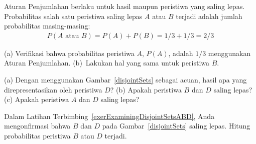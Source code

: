 Aturan Penjumlahan berlaku untuk hasil maupun peristiwa yang saling lepas. Probabilitas salah satu peristiwa saling lepas $A$ atau $B$ terjadi adalah jumlah probabilitas masing-masing:
\begin{align*}
P(A\text{ atau }B) = P(A) + P(B) = 1/3 + 1/3 = 2/3
\end{align*}

\begin{exercisewrap}
\begin{nexercise}
(a) Verifikasi bahwa probabilitas peristiwa $A$, $P(A)$,
adalah $1/3$ menggunakan Aturan Penjumlahan.
(b)~Lakukan hal yang sama untuk peristiwa $B$.\footnotemark
\end{nexercise}
\end{exercisewrap}

\begin{exercisewrap}
\begin{nexercise} \label{exerExaminingDisjointSetsABD}
(a) Dengan menggunakan Gambar~\ref{disjointSets} sebagai acuan, hasil apa yang direpresentasikan oleh peristiwa $D$? (b) Apakah peristiwa $B$ dan $D$ saling lepas? (c) Apakah peristiwa $A$ dan $D$ saling lepas?\footnotemark
\end{nexercise}
\end{exercisewrap}

\begin{exercisewrap}
\begin{nexercise}
Dalam Latihan Terbimbing~\ref{exerExaminingDisjointSetsABD}, Anda mengonfirmasi bahwa $B$ dan $D$ pada Gambar~\ref{disjointSets} saling lepas. Hitung probabilitas peristiwa $B$ atau $D$ terjadi.\footnotemark
\end{nexercise}
\end{exercisewrap}



\D{\newpage}

